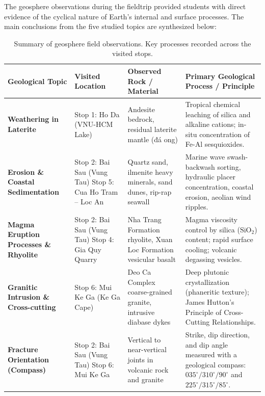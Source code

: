 \documentclass[11pt, a4paper]{article}
\begin{document}
The geosphere observations during the fieldtrip provided students with direct evidence of the cyclical nature of Earth's internal and surface processes. The main conclusions from the five studied topics are synthesized below:
\begin{table}[H]
    \centering
    \small
    \renewcommand{\arraystretch}{1.25}
    \caption[Summary of geosphere field observations]{Summary of geosphere field observations. Key processes recorded across the visited stops.}
    \label{tab:geosphere_summary_table}
    \begin{tabular}{p{2.8cm} p{3.2cm} p{4.2cm} p{4.6cm}}
        \toprule
        \textbf{Geological Topic} & \textbf{Visited Location} & \textbf{Observed Rock / Material} & \textbf{Primary Geological Process / Principle} \\
        \midrule
        \textbf{Weathering in Laterite} & Stop 1: Ho Da \newline (VNU-HCM Lake) & Andesite bedrock, residual laterite mantle (đá ong) & Tropical chemical leaching of silica and alkaline cations; in-situ concentration of Fe-Al sesquioxides. \\
        \midrule
        \textbf{Erosion \& Coastal Sedimentation} & Stop 2: Bai Sau (Vung Tau) \newline Stop 5: Cua Ho Tram -- Loc An & Quartz sand, ilmenite heavy minerals, sand dunes, rip-rap seawall & Marine wave swash-backwash sorting, hydraulic placer concentration, coastal erosion, aeolian wind ripples. \\
        \midrule
        \textbf{Magma Eruption Processes \& Rhyolite} & Stop 2: Bai Sau (Vung Tau) \newline Stop 4: Gia Quy Quarry & Nha Trang Formation rhyolite, Xuan Loc Formation vesicular basalt & Magma viscosity control by silica ($\text{SiO}_2$) content; rapid surface cooling; volcanic degassing vesicles. \\
        \midrule
        \textbf{Granitic Intrusion \& Cross-cutting} & Stop 6: Mui Ke Ga \newline (Ke Ga Cape) & Deo Ca Complex coarse-grained granite, intrusive diabase dykes & Deep plutonic crystallization (phaneritic texture); James Hutton's Principle of Cross-Cutting Relationships. \\
        \midrule
        \textbf{Fracture Orientation (Compass)} & Stop 2: Bai Sau (Vung Tau) \newline Stop 6: Mui Ke Ga & Vertical to near-vertical joints in volcanic rock and granite & Strike, dip direction, and dip angle measured with a geological compass: $035^{\circ}/310^{\circ}/90^{\circ}$ and $225^{\circ}/315^{\circ}/85^{\circ}$. \\

\end{tabular}
\end{table}
\end{document}
